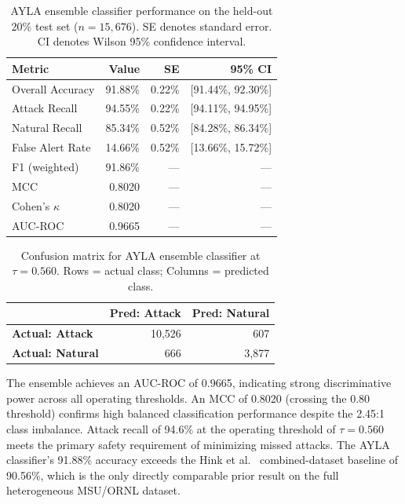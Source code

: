 \documentclass[twocolumn, 10pt, letterpaper]{article}
\begin{document}
\begin{table}[H]
\centering
\caption{AYLA ensemble classifier performance on the held-out 20\% test set ($n{=}15{,}676$).
         SE denotes standard error. CI denotes Wilson 95\% confidence interval.}
\label{tab:classifier}
\small
\begin{tabular}{lrrr}
\toprule
\textbf{Metric} & \textbf{Value} & \textbf{SE} & \textbf{95\% CI} \\
\midrule
Overall Accuracy   & 91.88\% & 0.22\% & [91.44\%, 92.30\%] \\
Attack Recall      & 94.55\% & 0.22\% & [94.11\%, 94.95\%] \\
Natural Recall     & 85.34\% & 0.52\% & [84.28\%, 86.34\%] \\
False Alert Rate   & 14.66\% & 0.52\% & [13.66\%, 15.72\%] \\
F1 (weighted)      & 91.86\% & ---    & --- \\
MCC                & 0.8020  & ---    & --- \\
Cohen's $\kappa$   & 0.8020  & ---    & --- \\
AUC-ROC            & 0.9665  & ---    & --- \\
\bottomrule
\end{tabular}
\end{table}

\begin{table}[H]
\centering
\caption{Confusion matrix for AYLA ensemble classifier at $\tau{=}0.560$.
         Rows = actual class; Columns = predicted class.}
\label{tab:cm}
\small
\begin{tabular}{lrr}
\toprule
 & \textbf{Pred: Attack} & \textbf{Pred: Natural} \\
\midrule
\textbf{Actual: Attack}  & 10{,}526 & 607 \\
\textbf{Actual: Natural} & 666      & 3{,}877 \\
\bottomrule
\end{tabular}
\end{table}

The ensemble achieves an AUC-ROC of 0.9665, indicating strong discriminative
power across all operating thresholds.
An MCC of 0.8020 (crossing the 0.80 threshold) confirms high balanced
classification performance despite the 2.45:1 class imbalance.
Attack recall of 94.6\% at the operating threshold of $\tau{=}0.560$ meets
the primary safety requirement of minimizing missed attacks.
The AYLA classifier's 91.88\% accuracy exceeds the Hink et al.\ \cite{hink2014ml}
combined-dataset baseline of 90.56\%, which is the only directly comparable
prior result on the full heterogeneous MSU/ORNL dataset.
\end{document}
